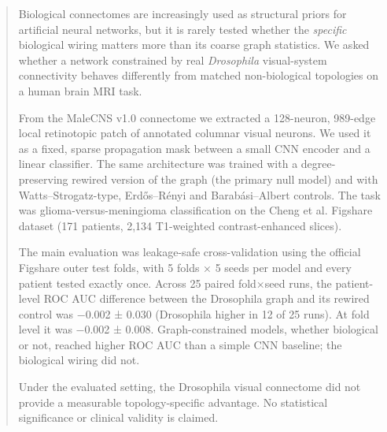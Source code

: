 \begin{abstract}
Biological connectomes are increasingly used as structural priors for artificial neural networks, but it is rarely tested whether the \emph{specific} biological wiring matters more than its coarse graph statistics. We asked whether a network constrained by real \emph{Drosophila} visual-system connectivity behaves differently from matched non-biological topologies on a human brain MRI task.

From the MaleCNS v1.0 connectome we extracted a 128-neuron, 989-edge local retinotopic patch of annotated columnar visual neurons. We used it as a fixed, sparse propagation mask between a small CNN encoder and a linear classifier. The same architecture was trained with a degree-preserving rewired version of the graph (the primary null model) and with Watts–Strogatz-type, Erdős–Rényi and Barabási–Albert controls. The task was glioma-versus-meningioma classification on the Cheng et al. Figshare dataset (171 patients, 2,134 T1-weighted contrast-enhanced slices).

The main evaluation was leakage-safe cross-validation using the official Figshare outer test folds, with 5 folds × 5 seeds per model and every patient tested exactly once. Across 25 paired fold×seed runs, the patient-level ROC AUC difference between the Drosophila graph and its rewired control was −0.002 ± 0.030 (Drosophila higher in 12 of 25 runs). At fold level it was −0.002 ± 0.008. Graph-constrained models, whether biological or not, reached higher ROC AUC than a simple CNN baseline; the biological wiring did not.

Under the evaluated setting, the Drosophila visual connectome did not provide a measurable topology-specific advantage. No statistical significance or clinical validity is claimed.

\end{abstract}
